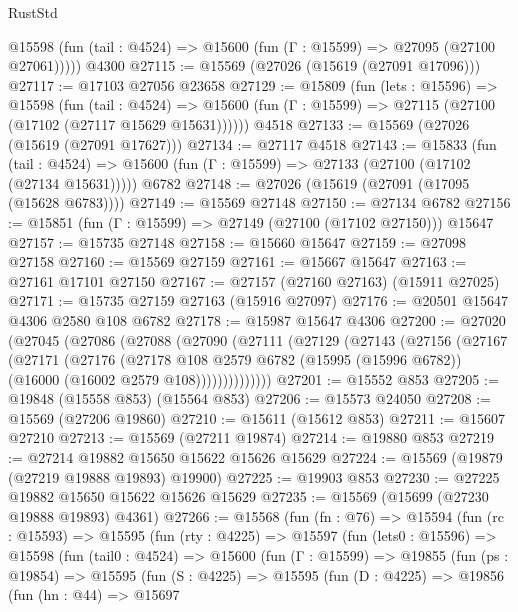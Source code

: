 \begin{lexlean}{RustStd}
\begin{coremodule}
      @15598 (fun (tail : @4524) => @15600 (fun (Γ : @15599) => @27095 (@27100 @27061)))))
    @4300
@27115 := @15569 (@27026 (@15619 (@27091 @17096)))
@27117 := @17103 @27056 @23658
@27129 := @15809
    (fun (lets : @15596) =>
    @15598
      (fun (tail : @4524) =>
      @15600 (fun (Γ : @15599) => @27115 (@27100 (@17102 (@27117 @15629 @15631))))))
    @4518
@27133 := @15569 (@27026 (@15619 (@27091 @17627)))
@27134 := @27117 @4518
@27143 := @15833
    (fun (tail : @4524) => @15600 (fun (Γ : @15599) => @27133 (@27100 (@17102 (@27134 @15631)))))
    @6782
@27148 := @27026 (@15619 (@27091 (@17095 (@15628 @6783))))
@27149 := @15569 @27148
@27150 := @27134 @6782
@27156 := @15851 (fun (Γ : @15599) => @27149 (@27100 (@17102 @27150))) @15647
@27157 := @15735 @27148
@27158 := @15660 @15647
@27159 := @27098 @27158
@27160 := @15569 @27159
@27161 := @15667 @15647
@27163 := @27161 @17101 @27150
@27167 := @27157 (@27160 @27163) (@15911 @27025)
@27171 := @15735 @27159 @27163 (@15916 @27097)
@27176 := @20501 @15647 @4306 @2580 @108 @6782
@27178 := @15987 @15647 @4306
@27200 := @27020
    (@27045
      (@27086
        (@27088
          (@27090
            (@27111
              (@27129
                (@27143
                  (@27156
                    (@27167
                      (@27171
                        (@27176
                          (@27178
                            @108
                            @2579
                            @6782
                            (@15995 (@15996 @6782))
                            (@16000 (@16002 @2579 @108))))))))))))))
@27201 := @15552 @853
@27205 := @19848 (@15558 @853) (@15564 @853)
@27206 := @15573 @24050
@27208 := @15569 (@27206 @19860)
@27210 := @15611 (@15612 @853)
@27211 := @15607 @27210
@27213 := @15569 (@27211 @19874)
@27214 := @19880 @853
@27219 := @27214 @19882 @15650 @15622 @15626 @15629
@27224 := @15569 (@19879 (@27219 @19888 @19893) @19900)
@27225 := @19903 @853
@27230 := @27225 @19882 @15650 @15622 @15626 @15629
@27235 := @15569 (@15699 (@27230 @19888 @19893) @4361)
@27266 := @15568
    (fun (fn : @76) =>
    @15594
      (fun (rc : @15593) =>
      @15595
        (fun (rty : @4225) =>
        @15597
          (fun (lets0 : @15596) =>
          @15598
            (fun (tail0 : @4524) =>
            @15600
              (fun (Γ : @15599) =>
              @19855
                (fun (ps : @19854) =>
                @15595
                  (fun (S : @4225) =>
                  @15595
                    (fun (D : @4225) =>
                    @19856
                      (fun (hn : @44) =>
                      @15697

\end{coremodule}
\end{lexlean}
